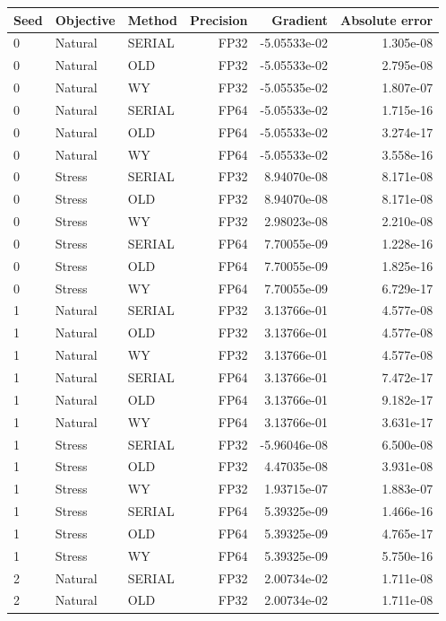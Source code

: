 \begin{tabular}{lllr rr}
\hline
Seed & Objective & Method & Precision & Gradient & Absolute error \\
\hline
0 & Natural & SERIAL & FP32 & -5.05533e-02 & 1.305e-08 \\
0 & Natural & OLD & FP32 & -5.05533e-02 & 2.795e-08 \\
0 & Natural & WY & FP32 & -5.05535e-02 & 1.807e-07 \\
0 & Natural & SERIAL & FP64 & -5.05533e-02 & 1.715e-16 \\
0 & Natural & OLD & FP64 & -5.05533e-02 & 3.274e-17 \\
0 & Natural & WY & FP64 & -5.05533e-02 & 3.558e-16 \\
0 & Stress & SERIAL & FP32 & 8.94070e-08 & 8.171e-08 \\
0 & Stress & OLD & FP32 & 8.94070e-08 & 8.171e-08 \\
0 & Stress & WY & FP32 & 2.98023e-08 & 2.210e-08 \\
0 & Stress & SERIAL & FP64 & 7.70055e-09 & 1.228e-16 \\
0 & Stress & OLD & FP64 & 7.70055e-09 & 1.825e-16 \\
0 & Stress & WY & FP64 & 7.70055e-09 & 6.729e-17 \\
1 & Natural & SERIAL & FP32 & 3.13766e-01 & 4.577e-08 \\
1 & Natural & OLD & FP32 & 3.13766e-01 & 4.577e-08 \\
1 & Natural & WY & FP32 & 3.13766e-01 & 4.577e-08 \\
1 & Natural & SERIAL & FP64 & 3.13766e-01 & 7.472e-17 \\
1 & Natural & OLD & FP64 & 3.13766e-01 & 9.182e-17 \\
1 & Natural & WY & FP64 & 3.13766e-01 & 3.631e-17 \\
1 & Stress & SERIAL & FP32 & -5.96046e-08 & 6.500e-08 \\
1 & Stress & OLD & FP32 & 4.47035e-08 & 3.931e-08 \\
1 & Stress & WY & FP32 & 1.93715e-07 & 1.883e-07 \\
1 & Stress & SERIAL & FP64 & 5.39325e-09 & 1.466e-16 \\
1 & Stress & OLD & FP64 & 5.39325e-09 & 4.765e-17 \\
1 & Stress & WY & FP64 & 5.39325e-09 & 5.750e-16 \\
2 & Natural & SERIAL & FP32 & 2.00734e-02 & 1.711e-08 \\
2 & Natural & OLD & FP32 & 2.00734e-02 & 1.711e-08 \\

\end{tabular}

